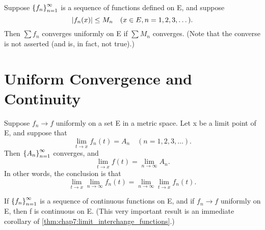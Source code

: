\begin{theorem} %
  \label{thm:chap7:weierstrass_m_test}
  Suppose $\left\{ f_n \right\}_{n=1}^\infty$ is a sequence of functions defined on E, and suppose
  \[ \left\lvert f_n(x) \right\rvert \le M_n \quad (x \in E, n=1, 2, 3, \dots). \]
  Then $\sum f_n$ converges uniformly on E if $\sum M_n$ converges.
  (Note that the converse is not asserted (and is, in fact, not true).)
\end{theorem}

\section{Uniform Convergence and Continuity}
\label{sec:chap7:uniform_conv_continuity}

\begin{theorem} %
  \label{thm:chap7:limit_interchange_functions}
  Suppose $f_n \to f$ uniformly on a set E in a metric space. Let x
  be a limit point of E, and suppose that
  \begin{equation} \label{eq:chap7:limit_fn_t}
    \lim_{t \to x} f_n(t) = A_n \quad (n=1, 2, 3, \dots).
  \end{equation}
  Then $\left\{ A_n \right\}_{n=1}^\infty$ converges, and
  \begin{equation} \label{eq:chap7:limit_f_t_result}
    \lim_{t \to x} f(t) = \lim_{n \to \infty} A_n.
  \end{equation}
  In other words, the conclusion is that
  \begin{equation} \label{eq:chap7:limit_interchange_explicit}
    \lim_{t \to x} \lim_{n \to \infty} f_n(t) = \lim_{n \to \infty}
    \lim_{t \to x} f_n(t).
  \end{equation}
\end{theorem}

\begin{theorem}
  \label{thm:chap7:uniform_limit_continuous}
  If $\left\{ f_n \right\}_{n=1}^\infty$ is a sequence of continuous functions on E, and
  if $f_n \to f$ uniformly on E, then f is continuous on E.
  (This very important result is an immediate corollary of
  \autoref{thm:chap7:limit_interchange_functions}.)
\end{theorem}



